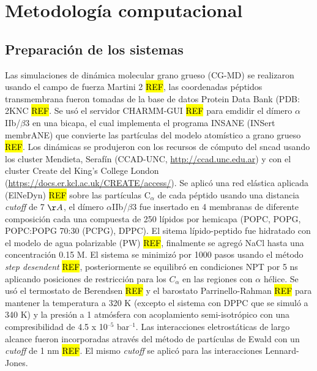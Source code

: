 
\section{Metodología computacional}

\subsection{Preparación de los sistemas}



Las simulaciones de dinámica molecular grano grueso (CG-MD) se realizaron usando el campo de fuerza Martini 2 \hl{REF}, las coordenadas péptidos transmembrana fueron tomadas de la base de datos Protein Data Bank (PDB: 2KNC \hl{REF}. Se usó el servidor CHARMM-GUI \hl{REF} para emdidir el dímero $\alpha$IIb/$\beta$3 en una bicapa, el cual implementa el programa INSANE (INSert membrANE) que convierte las partículas del modelo atomístico a grano grueso \hl{REF}.
Los dinámicas se produjeron con los recursos de cómputo del \ac{sncad} usando los cluster Mendieta, Serafín (CCAD-UNC, \url{http://ccad.unc.edu.ar}) y con el cluster Create del King’s College London (\url{https://docs.er.kcl.ac.uk/CREATE/access/}). Se aplicó una red elástica aplicada (ElNeDyn) \hl{REF} sobre las partículas C$_\alpha$ de cada péptido usando una distancia \textit{cutoff} de 7 $\AA$, el dímero $\alpha$IIb/$\beta$3  fue insertado en 4 membranas de diferente composición cada una compuesta de 250 lípidos por hemicapa (POPC, POPG, POPC:POPG 70:30 (PCPG), DPPC). El sitema lípido-peptido fue hidratado con el modelo de agua polarizable (PW) \hl{REF}, finalmente se agregó NaCl hasta una concentración 0.15 M. El sistema se minimizó por 1000 pasos usando el método \textit{step desendent} \hl{REF}, posteriormente se equilibró en condiciones NPT por 5 ns aplicando posiciones de restricción para los $C_\alpha$ en las regiones con $\alpha$ hélice. Se usó el termostato de Berendsen \hl{REF} y el barostato Parrinello-Rahman \hl{REF} para mantener la temperatura a 320 K (excepto el sistema con DPPC que se simuló a 340 K) y la presión a 1 atmósfera con acoplamiento semi-isotrópico con una compresibilidad de 4.5 x 10$^{\text{--5}}$ bar$^{\text{--1}}$. Las interacciones eletrostáticas de largo alcance fueron incorporadas através del método de partículas de  Ewald con un \textit{cutoff} de 1 nm \hl{REF}. El mismo \textit{cutoff} se aplicó para las interacciones Lennard-Jones.


